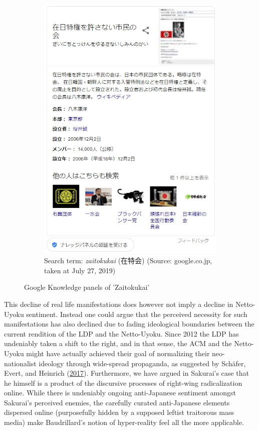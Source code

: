\documentclass[10pt,british,A4paper,,openany]{memoir}
\begin{document}
\begin{figure}[!htb]
\begin{subfigure}[b]{0.40\textwidth}
  \includegraphics[width=\textwidth]{images/2channel/zaitokukaijp.jpg}
  \caption{Search term: \textit{zaitokukai} (在特会) (Source: google.co.jp, taken at July 27, 2019)}
  \label{fig:zaitokukaijp}
 \end{subfigure}
 \caption{Google Knowledge panels of 'Zaitokukai'}\label{fig:googlezaitokukai}
\end{figure}

This decline of real life manifestations does however not imply a
decline in Netto-Uyoku sentiment. Instead one could argue that the
perceived necessity for such manifestations has also declined due to
fading ideological boundaries between the current rendition of the LDP
and the Netto-Uyoku. Since 2012 the LDP has undeniably taken a shift to
the right, and in that sense, the ACM and the Netto-Uyoku might have
actually achieved their goal of normalizing their neo-nationalist
ideology through wide-spread propaganda, as suggested by Schäfer, Evert,
and Heinrich (\protect\hyperlink{ref-schafer_japans_2017}{2017}).
Furthermore, we have argued in Sakurai's case that he himself is a
product of the discursive processes of right-wing radicalization online.
While there is undeniably ongoing anti-Japanese sentiment amongst
Sakurai's perceived enemies, the carefully curated anti-Japanese
elements dispersed online (purposefully hidden by a supposed leftist
traitorous mass media) make Baudrillard's notion of hyper-reality feel
all the more applicable.
\end{document}
